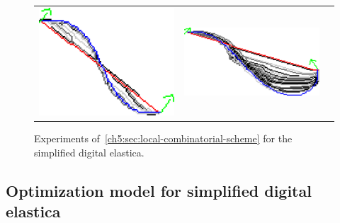 \begin{figure}[]
\begin{tabular}{ccc}
\includegraphics[scale=0.25]{figures/chapter5/fixed-orientations/selastica/len_pen_0.01/curve-2/summary.pdf} &
\includegraphics[scale=0.25]{figures/chapter5/fixed-orientations/selastica/len_pen_0.01/curve-3/summary.pdf}
\end{tabular}
\caption{ Experiments of~\cref{ch5:sec:local-combinatorial-scheme} for the simplified digital elastica.}
\label{fig:simplified-elastica}
\end{figure}


\subsection{Optimization model for simplified digital elastica}
\label{ch5:subsec:optimization-model-simplified-digital-elastica}

